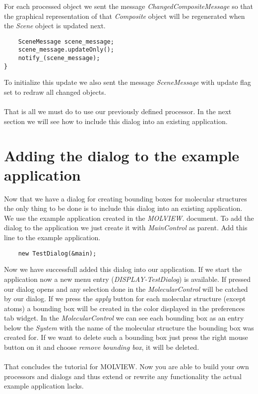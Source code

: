 For each processed object we sent the message {\em ChangedCompositeMessage} so
that the graphical representation of that {\em Composite} object will be regenerated
when the {\em Scene} object is updated next.			

\begin{verbatim}
	SceneMessage scene_message;
	scene_message.updateOnly();
	notify_(scene_message);
}
\end{verbatim}

To initialize this update we also sent the message {\em SceneMessage} with 
update flag set to redraw all changed objects.\\ \\

That is all we must do to use our previously defined processor. In the next section
we will see how to include this dialog into an existing application.



\section{Adding the dialog to the example application}
\label{section:adding_the_dialog}

Now that we have a dialog for creating bounding boxes for molecular structures
the only thing to be done is to include this dialog into an existing application.
We use the example application created in the {\em MOLVIEW.} document.
To add the dialog to the application we just create it with {\em MainControl}
as parent. Add this line to the example application.

\begin{verbatim}
	new TestDialog(&main);
\end{verbatim}

Now we have successfull added this dialog into our application. If we start the
application now a new menu entry ({\em DISPLAY-TestDialog}) is available. If pressed our dialog opens and
any selection done in the {\em MolecularControl} will be catched by our dialog. If we press
the {\em apply} button for each molecular structure (except atoms) a bounding box
will be created in the color displayed in the preferences tab widget. In the {\em MolecularControl}
we can see each bounding box as an entry below the {\em System} with the name of
the molecular structure the bounding box was created for.
If we want to delete such a bounding box just press the right mouse button on it and
choose {\em remove bounding box}, it will be deleted.\\ \\

That concludes the tutorial for MOLVIEW. Now you are able to build your own
processors and dialogs and thus extend or rewrite any functionality the actual
example application lacks.
